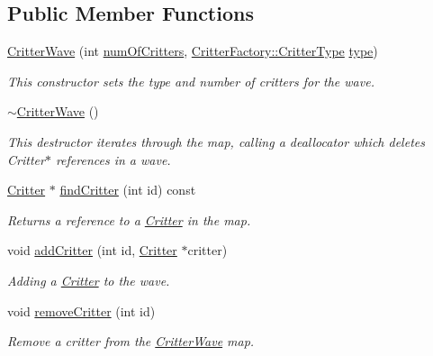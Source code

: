 \subsection*{Public Member Functions}
\begin{DoxyCompactItemize}
\item 
\hyperlink{class_critter_wave_a5c9542e09173535de5ce7fec7608eead}{Critter\+Wave} (int \hyperlink{class_critter_wave_a6c8edb08492ed068c5e4c5323695c29d}{num\+Of\+Critters}, \hyperlink{class_critter_factory_a865a154e14b99d3dbf4d329a49210f6a}{Critter\+Factory\+::\+Critter\+Type} \hyperlink{class_critter_wave_a15d8e4b3eb954f0dfa4f6224d90e0ae0}{type})
\begin{DoxyCompactList}\small\item\em This constructor sets the type and number of critters for the wave. \end{DoxyCompactList}\item 
\hyperlink{class_critter_wave_a89e6acba97071ff44a9493315a8f073b}{$\sim$\+Critter\+Wave} ()
\begin{DoxyCompactList}\small\item\em This destructor iterates through the map, calling a deallocator which deletes Critter$\ast$ references in a wave. \end{DoxyCompactList}\item 
\hyperlink{class_critter}{Critter} $\ast$ \hyperlink{class_critter_wave_a1244e59ebd702edd2530e6256779ace0}{find\+Critter} (int id) const 
\begin{DoxyCompactList}\small\item\em Returns a reference to a \hyperlink{class_critter}{Critter} in the map. \end{DoxyCompactList}\item 
void \hyperlink{class_critter_wave_a3c6dcf79b57cb7e208471c5bc387f22d}{add\+Critter} (int id, \hyperlink{class_critter}{Critter} $\ast$critter)
\begin{DoxyCompactList}\small\item\em Adding a \hyperlink{class_critter}{Critter} to the wave. \end{DoxyCompactList}\item 
void \hyperlink{class_critter_wave_aa7761b522b8774ef9b319861ae6ab844}{remove\+Critter} (int id)
\begin{DoxyCompactList}\small\item\em Remove a critter from the \hyperlink{class_critter_wave}{Critter\+Wave} map. \end{DoxyCompactList}\item 

\end{DoxyCompactItemize}
